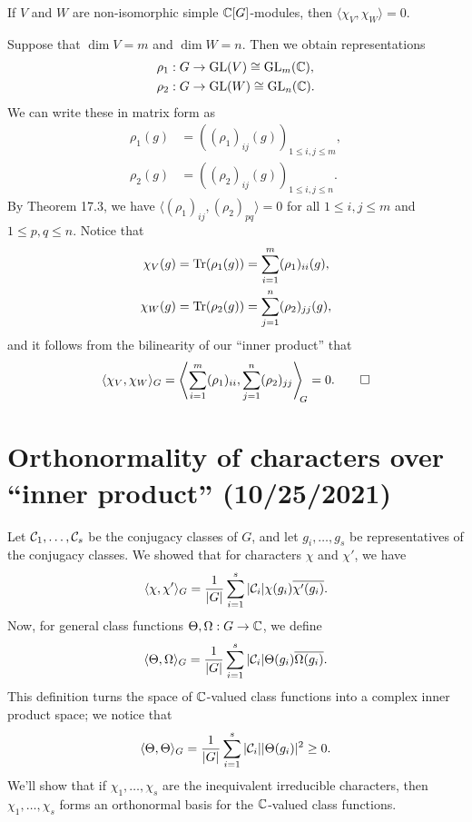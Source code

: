 \begin{cor}{}
    If $V$ and $W$ are non-isomorphic simple $\mathbb{C}[G]$-modules, then 
    $\langle \chi_V, \chi_W \rangle = 0$. 
\end{cor}
\begin{pf}
    Suppose that $\dim V = m$ and $\dim W = n$. Then we obtain representations
    \begin{align*}
        \rho_1 &: G \to \operatorname{GL}(V) \cong \operatorname{GL}_m(\mathbb{C}), \\ 
        \rho_2 &: G \to \operatorname{GL}(W) \cong \operatorname{GL}_n(\mathbb{C}). 
    \end{align*} 
    We can write these in matrix form as 
    \begin{align*}
        \rho_1(g) &= \left((\rho_1)_{ij}(g)\right)_{1\leq i,j\leq m}, \\ 
        \rho_2(g) &= \left((\rho_2)_{ij}(g)\right)_{1\leq i,j \leq n}.  
    \end{align*}
    By Theorem 17.3, we have $\langle (\rho_1)_{ij}, (\rho_2)_{pq} \rangle = 0$
    for all $1 \leq i, j \leq m$ and $1 \leq p, q \leq n$. Notice that 
    \begin{align*}
        \chi_V(g) &= \operatorname{Tr}(\rho_1(g)) = \sum_{i=1}^m (\rho_1)_{ii}(g), \\ 
        \chi_W(g) &= \operatorname{Tr}(\rho_2(g)) = \sum_{j=1}^n (\rho_2)_{jj}(g), 
    \end{align*}
    and it follows from the bilinearity of our ``inner product'' that 
    \[ \langle \chi_V, \chi_W \rangle_G = \left\langle \sum_{i=1}^m 
    (\rho_1)_{ii}, \sum_{j=1}^n (\rho_2)_{jj} \right\rangle_{\!\!G} = 0. \qedhere \] 
\end{pf}

\section{Orthonormality of characters over ``inner product'' (10/25/2021)}
Let ${\cal C}_1, \dots, {\cal C}_s$ be the conjugacy classes of $G$, and let 
$g_i, \dots, g_s$ be representatives of the conjugacy classes. We showed 
that for characters $\chi$ and $\chi'$, we have 
\[ \langle \chi, \chi' \rangle_G = \frac1{|G|} \sum_{i=1}^s |{\cal C}_i| 
\chi(g_i) \overline{\chi'(g_i)}. \] 
Now, for general class functions $\Theta, \Omega : G \to \mathbb{C}$, we define 
\[ \langle \Theta, \Omega \rangle_G = \frac1{|G|} \sum_{i=1}^s |{\cal C}_i| 
\Theta(g_i) \overline{\Omega(g_i)}. \] 
This definition turns the space of $\mathbb{C}$-valued class functions into a complex 
inner product space; we notice that 
\[ \langle \Theta, \Theta \rangle_G = \frac1{|G|} \sum_{i=1}^s |{\cal C}_i|
|\Theta(g_i)|^2 \geq 0. \] 
We'll show that if $\chi_1, \dots, \chi_s$ are the inequivalent irreducible 
characters, then $\chi_1, \dots, \chi_s$ forms an orthonormal basis for the 
$\mathbb{C}$-valued class functions. 

